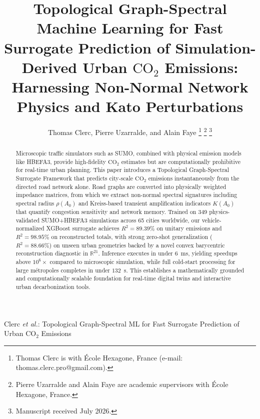 \documentclass[lettersize,journal]{IEEEtran}
\begin{document}
\title{Topological Graph-Spectral Machine Learning for Fast Surrogate Prediction of Simulation-Derived Urban $\text{CO}_2$ Emissions: Harnessing Non-Normal Network Physics and Kato Perturbations}

\author{Thomas Clerc, Pierre Uzarralde, and Alain Faye
\thanks{Thomas Clerc is with École Hexagone, France (e-mail: thomas.clerc.pro@gmail.com).}%
\thanks{Pierre Uzarralde and Alain Faye are academic supervisors with École Hexagone, France.}%
\thanks{Manuscript received July 2026.}}

%
{Clerc \MakeLowercase{\textit{et al.}}: Topological Graph-Spectral ML for Fast Surrogate Prediction of Urban $\text{CO}_2$ Emissions}

\maketitle

\begin{abstract}
Microscopic traffic simulators such as SUMO, combined with physical emission models like HBEFA3, provide high-fidelity $\text{CO}_2$ estimates but are computationally prohibitive for real-time urban planning. This paper introduces a Topological Graph-Spectral Surrogate Framework that predicts city-scale $\text{CO}_2$ emissions instantaneously from the directed road network alone. Road graphs are converted into physically weighted impedance matrices, from which we extract non-normal spectral signatures including spectral radius $\rho(A_0)$ and Kreiss-based transient amplification indicators $K(A_0)$ that quantify congestion sensitivity and network memory. Trained on 349 physics-validated SUMO+HBEFA3 simulations across 65 cities worldwide, our vehicle-normalized XGBoost surrogate achieves $R^2 = 89.39\%$ on unitary emissions and $R^2 = 98.95\%$ on reconstructed totals, with strong zero-shot generalization ($R^2 = 88.66\%$) on unseen urban geometries backed by a novel convex barycentric reconstruction diagnostic in $\mathbb{R}^{21}$. Inference executes in under $6$~ms, yielding speedups above $10^6\times$ compared to microscopic simulation, while full cold-start processing for large métropoles completes in under $132$~s. This establishes a mathematically grounded and computationally scalable foundation for real-time digital twins and interactive urban decarbonization tools.
\end{abstract}
\end{document}
